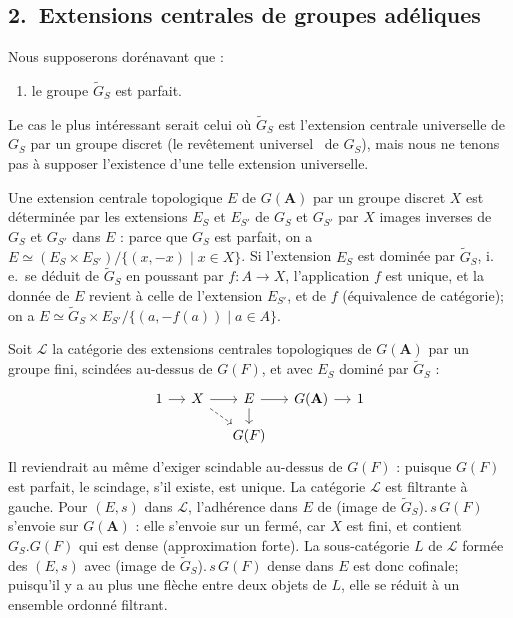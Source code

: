 \documentclass[11pt]{amsart}
\theoremstyle{plain}
\theoremstyle{definition}
\begin{document}
\subsection*{2.\ Extensions centrales de groupes ad\'eliques}

Nous supposerons dor\'enavant que :
\begin{enumerate}
\item[(iii)] le groupe $\widetilde{G}_S$ est parfait.
\end{enumerate}

Le cas le plus int\'eressant serait celui o\`u $\widetilde{G}_S$ est l'extension centrale universelle de $G_S$ par un groupe discret (le \og rev\^etement universel \fg\ de $G_S$), mais nous ne tenons pas \`a supposer l'existence d'une telle extension universelle.

Une extension centrale topologique $E$ de $G(\mathbf{A})$ par un groupe discret $X$ est d\'etermin\'ee par les extensions $E_S$ et $E_{S'}$ de $G_S$ et $G_{S'}$ par $X$ images inverses de $G_S$ et $G_{S'}$ dans $E$ : parce que $G_S$ est parfait, on a $E\simeq(E_S\times E_{S'})/\{(x,-x)\mid x\in X\}$. Si l'extension $E_S$ est domin\'ee par $\widetilde{G}_S$, i.\,e.\ se d\'eduit de $\widetilde{G}_S$ en poussant par $f:A\to X$, l'application $f$ est unique, et la donn\'ee de $E$ revient \`a celle de l'extension $E_{S'}$, et de $f$ (\'equivalence de cat\'egorie); on a $E\simeq\widetilde{G}_S\times E_{S'}/\{(a,-f(a))\mid a\in A\}$.

Soit $\mathscr{L}$ la cat\'egorie des extensions centrales topologiques de $G(\mathbf{A})$ par un groupe fini, scind\'ees au-dessus de $G(F)$, et avec $E_S$ domin\'e par $\widetilde{G}_S$ :
\[
\begin{tikzcd}[column sep=small, row sep=small]
1 \arrow[r] & X \arrow[r] \arrow[dr, dashrightarrow] & E \arrow[r] \arrow[d] & G(\mathbf{A}) \arrow[r] & 1 \\
& & G(F) & &
\end{tikzcd}
\]
Il reviendrait au m\^eme d'exiger \og scindable au-dessus de $G(F)$ \fg : puisque $G(F)$ est parfait, le scindage, s'il existe, est unique. La cat\'egorie $\mathscr{L}$ est filtrante \`a gauche. Pour $(E,s)$ dans $\mathscr{L}$, l'adh\'erence dans $E$ de (image de $\widetilde{G}_S$).\,$s\,G(F)$ s'envoie sur $G(\mathbf{A})$ : elle s'envoie sur un ferm\'e, car $X$ est fini, et contient $G_S.G(F)$ qui est dense (approximation forte). La sous-cat\'egorie $L$ de $\mathscr{L}$ form\'ee des $(E,s)$ avec (image de $\widetilde{G}_S$).\,$s\,G(F)$ dense dans $E$ est donc cofinale; puisqu'il y a au plus une fl\`eche entre deux objets de $L$, elle se r\'eduit \`a un ensemble ordonn\'e filtrant.
\end{document}
